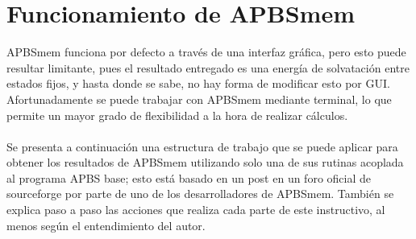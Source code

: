 \chapter{Funcionamiento de APBSmem}\label{Anexo:APBSmem}
\noindent
APBSmem funciona por defecto a través de una interfaz gráfica, pero esto puede resultar limitante, pues el resultado entregado es una energía de solvatación entre estados fijos, y hasta donde se sabe, no hay forma de modificar esto por GUI. Afortunadamente se puede trabajar con APBSmem mediante terminal, lo que permite un mayor grado de flexibilidad a la hora de realizar cálculos.\\\\
Se presenta a continuación una estructura de trabajo que se puede aplicar para obtener los resultados de APBSmem utilizando solo una de sus rutinas acoplada al programa APBS base; esto está basado en un post en un foro oficial de sourceforge por parte de uno de los desarrolladores de APBSmem. También se explica paso a paso las acciones que realiza cada parte de este instructivo, al menos según el entendimiento del autor.

